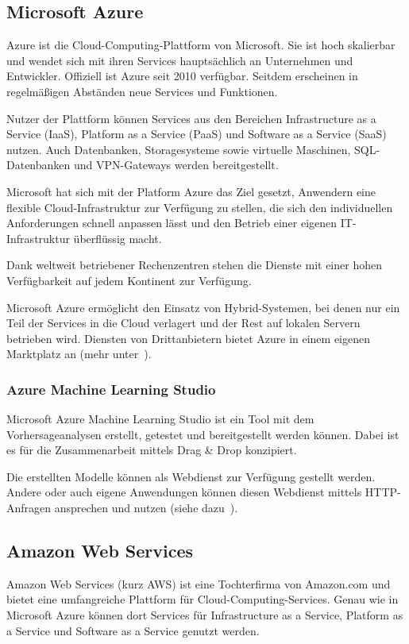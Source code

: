\subsection{Microsoft Azure}
Azure ist die Cloud-Computing-Plattform von Microsoft. Sie ist hoch skalierbar und wendet sich mit ihren Services
hauptsächlich an Unternehmen und Entwickler. Offiziell ist Azure seit 2010 verfügbar. Seitdem erscheinen in regelmäßigen
Abständen neue Services und Funktionen.

Nutzer der Plattform können Services aus den Bereichen Infrastructure as a Service (IaaS), Platform as a Service (PaaS)
und Software as a Service (SaaS) nutzen. Auch Datenbanken, Storagesysteme sowie virtuelle Maschinen, SQL-Datenbanken und
VPN-Gateways werden bereitgestellt.

Microsoft hat sich mit der Platform Azure das Ziel gesetzt, Anwendern eine flexible Cloud-Infrastruktur zur Verfügung
zu stellen, die sich den individuellen Anforderungen schnell anpassen lässt und den Betrieb einer eigenen
IT-Infrastruktur überflüssig macht.

Dank weltweit betriebener Rechenzentren stehen die Dienste mit einer hohen Verfügbarkeit auf jedem Kontinent zur
Verfügung.

Microsoft Azure ermöglicht den Einsatz von Hybrid-Systemen, bei denen nur ein Teil der Services in die Cloud verlagert
und der Rest auf lokalen Servern betrieben wird. Diensten von Drittanbietern bietet Azure in einem eigenen Marktplatz an
(mehr unter~\cite{online_grundlagen_azure}).

\subsubsection{Azure Machine Learning Studio}
Microsoft Azure Machine Learning Studio ist ein Tool mit dem Vorhersageanalysen erstellt, getestet und bereitgestellt
werden können. Dabei ist es für die Zusammenarbeit mittels Drag \& Drop konzipiert.

Die erstellten Modelle können als Webdienst zur Verfügung gestellt werden. Andere oder auch eigene Anwendungen können
diesen Webdienst mittels HTTP-Anfragen ansprechen und nutzen (siehe dazu~\cite{article_grundlagen_azure_studio}).

\subsection{Amazon Web Services}
Amazon Web Services (kurz AWS) ist eine Tochterfirma von Amazon.com und bietet eine umfangreiche Plattform für
Cloud-Computing-Services. Genau wie in Microsoft Azure können dort Services für Infrastructure as a Service, Platform as
a Service und Software as a Service genutzt werden.

